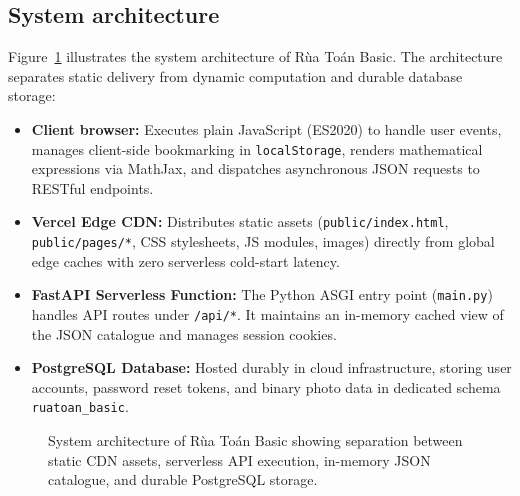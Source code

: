 \subsection{System architecture}
Figure~\ref{fig:architecture} illustrates the system architecture of Rùa Toán Basic. The architecture
separates static delivery from dynamic computation and durable database storage:
\begin{itemize}
  \item \textbf{Client browser:} Executes plain JavaScript (ES2020) to handle user events, manages client-side
        bookmarking in \texttt{localStorage}, renders mathematical expressions via MathJax, and dispatches
        asynchronous JSON requests to RESTful endpoints.
  \item \textbf{Vercel Edge CDN:} Distributes static assets (\texttt{public/index.html}, \texttt{public/pages/*},
        CSS stylesheets, JS modules, images) directly from global edge caches with zero serverless cold-start latency.
  \item \textbf{FastAPI Serverless Function:} The Python ASGI entry point (\texttt{main.py}) handles API routes
        under \texttt{/api/*}. It maintains an in-memory cached view of the JSON catalogue and manages session cookies.
  \item \textbf{PostgreSQL Database:} Hosted durably in cloud infrastructure, storing user accounts, password
        reset tokens, and binary photo data in dedicated schema \texttt{ruatoan\_basic}.
\end{itemize}

\begin{figure}[ht]
\centering
{}
\caption{System architecture of Rùa Toán Basic showing separation between static CDN assets, serverless API execution, in-memory JSON catalogue, and durable PostgreSQL storage.}
\label{fig:architecture}
\end{figure}

